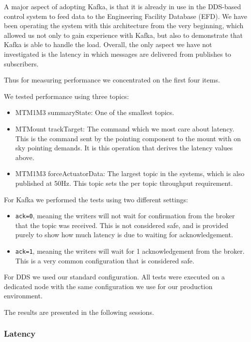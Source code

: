 \documentclass[]{spie}  %
\begin{document}
A major aspect of adopting Kafka, is that it is already in use in the DDS-based control system to feed data to the Engineering Facility Database (EFD).
We have been operating the system with this architecture from the very beginning, which allowed us not only to gain experience with Kafka, but also to demonstrate that Kafka is able to handle the load.
Overall, the only aspect we have not investigated is the latency in which messages are delivered from publishes to subscribers.

Thus for measuring performance we concentrated on the first four items.

We tested performance using three topics:

\begin{itemize}
  \item MTM1M3 summaryState: One of the smallest topics.
  \item MTMount trackTarget: The command which we most care about latency.
    This is the command sent by the pointing component to the mount with on sky pointing demands.
    It is this operation that derives the latency values above.
  \item MTM1M3 forceActuatorData: The largest topic in the systems, which is also published at 50Hz.
    This topic sets the per topic throughput requirement.
\end{itemize}

For Kafka we performed the tests using two different settings:

\begin{itemize}
  \item \texttt{ack=0}, meaning the writers will not wait for confirmation from the broker that the topic was received.
    This is not considered safe, and is provided purely to show how much latency is due to waiting for acknowledgement.
  \item \texttt{ack=1}, meaning the writers will wait for 1 acknowledgement from the broker.
    This is a very common configuration that is considered safe.
\end{itemize}

For DDS we used our standard configuration.
All tests were executed on a dedicated node with the same configuration we use for our production environment.

The results are presented in the following sessions.

\subsubsection{Latency}
\label{subsubsec:performance:latency}
\end{document}
